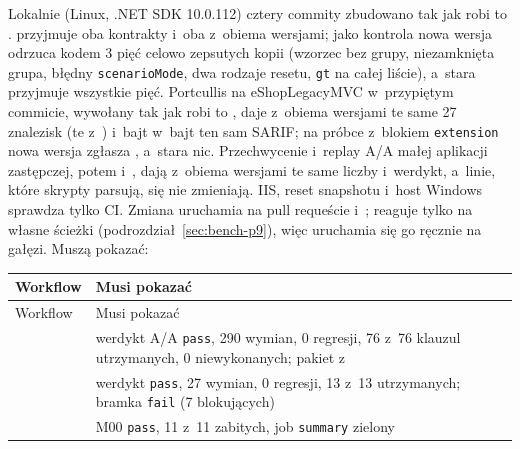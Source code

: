 Lokalnie (Linux, .NET SDK 10.0.112) cztery commity zbudowano tak jak robi to
.  przyjmuje oba kontrakty i~oba
 z~obiema wersjami; jako kontrola nowa wersja odrzuca kodem 3 pięć
celowo zepsutych kopii (wzorzec bez grupy, niezamknięta grupa, błędny \texttt{scenarioMode},
dwa rodzaje resetu, \texttt{gt} na całej liście), a~stara przyjmuje wszystkie pięć.
Portcullis na eShopLegacyMVC w~przypiętym commicie, wywołany tak jak robi to
, daje z~obiema wersjami te same 27 znalezisk (te z~)
i~bajt w~bajt ten sam SARIF; na próbce z~blokiem \texttt{extension} nowa wersja zgłasza
, a~stara nic. Przechwycenie i~replay A/A małej aplikacji
zastępczej, potem  i~, dają
z~obiema wersjami te same liczby i~werdykt, a~linie, które skrypty parsują, się nie zmieniają.
IIS, reset snapshotu i~host Windows sprawdza tylko CI. Zmiana  uruchamia na
pull requeście  i~;  reaguje
tylko na własne ścieżki (podrozdział~\ref{sec:bench-p9}), więc uruchamia się go ręcznie na
gałęzi. Muszą pokazać:

{\small
\begin{xltabular}{\linewidth}{@{}>{\raggedright\arraybackslash}p{2.9cm} >{\raggedright\arraybackslash}X@{}}
\toprule
Workflow & Musi pokazać \\
\midrule
\endfirsthead
\toprule
Workflow & Musi pokazać \\
\midrule
\endhead
{} & werdykt A/A \texttt{pass}, 290 wymian, 0 regresji, 76 z~76 klauzul
  utrzymanych, 0 niewykonanych; pakiet z~ \\
 & werdykt \texttt{pass}, 27 wymian, 0 regresji, 13 z~13 utrzymanych;
  bramka \texttt{fail} (7 blokujących) \\
 & M00 \texttt{pass}, 11 z~11 zabitych, job \texttt{summary} zielony \\
\bottomrule
\end{xltabular}
}

